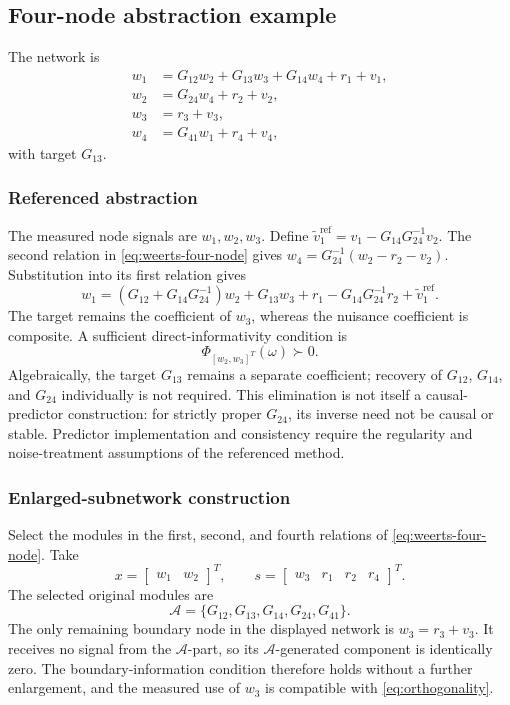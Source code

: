 \documentclass[11pt,a4paper]{article}
\newcommand{\specmat}[1]{\Phi_{#1}}
\newcommand{\Aset}{\mathcal A}
\begin{document}
\subsection{Four-node abstraction example}

The network is
\begin{align}
  w_1&=G_{12}w_2+G_{13}w_3+G_{14}w_4+r_1+v_1,\\
  w_2&=G_{24}w_4+r_2+v_2,\\
  w_3&=r_3+v_3,\\
  w_4&=G_{41}w_1+r_4+v_4,
  \label{eq:weerts-four-node}
\end{align}
with target $G_{13}$.

\subsubsection{Referenced abstraction}

The measured node signals are $w_1,w_2,w_3$.  Define $\widetilde v_1^{\mathrm{ref}}=v_1-G_{14}G_{24}^{-1}v_2$.  The second relation in \eqref{eq:weerts-four-node} gives $w_4=G_{24}^{-1}(w_2-r_2-v_2)$.  Substitution into its first relation gives
\begin{equation}
  w_1=
  \left(G_{12}+G_{14}G_{24}^{-1}\right)w_2
  +G_{13}w_3
  +r_1-G_{14}G_{24}^{-1}r_2
  +\widetilde v_1^{\mathrm{ref}}.
  \label{eq:weerts-indirect}
\end{equation}
The target remains the coefficient of $w_3$, whereas the nuisance coefficient is composite.  A sufficient direct-informativity condition is
\begin{equation}
  \specmat{[w_2,w_3]^T}(\omega)\succ0.
  \label{eq:weerts-reference-info}
\end{equation}
Algebraically, the target $G_{13}$ remains a separate coefficient; recovery of $G_{12}$, $G_{14}$, and $G_{24}$ individually is not required.  This elimination is not itself a causal-predictor construction: for strictly proper $G_{24}$, its inverse need not be causal or stable.  Predictor implementation and consistency require the regularity and noise-treatment assumptions of the referenced method.

\subsubsection{Enlarged-subnetwork construction}

Select the modules in the first, second, and fourth relations of \eqref{eq:weerts-four-node}.  Take
\[
  x=\begin{bmatrix}w_1&w_2\end{bmatrix}^{\!T},
  \qquad
  s=\begin{bmatrix}w_3&r_1&r_2&r_4\end{bmatrix}^{\!T}.
\]
The selected original modules are
\[
  \Aset=\{G_{12},G_{13},G_{14},G_{24},G_{41}\}.
\]
The only remaining boundary node in the displayed network is $w_3=r_3+v_3$.  It receives no signal from the $\Aset$-part, so its $\Aset$-generated component is identically zero.  The boundary-information condition therefore holds without a further enlargement, and the measured use of $w_3$ is compatible with \eqref{eq:orthogonality}.
\end{document}
